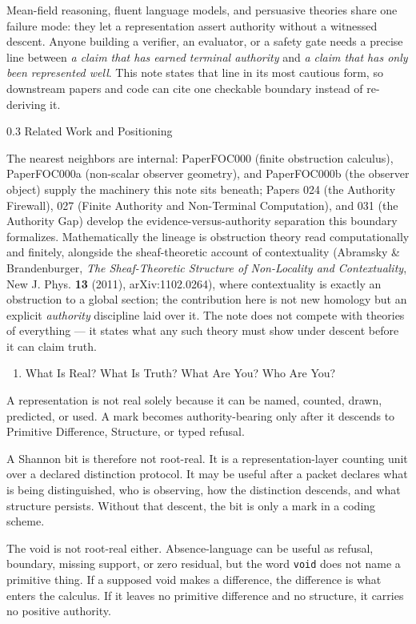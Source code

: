 \documentclass[
  10pt,
]{article}
\providecommand{\tightlist}{%
  \setlength{\itemsep}{0pt}\setlength{\parskip}{0pt}}
\providecommand{\tightlist}{%
  \setlength{\itemsep}{0pt}\setlength{\parskip}{0pt}}
\DeclareRobustCommand{\texttt}[1]{{\paperSymbolFont\nolinkurl{#1}}}
\begin{document}
Mean-field reasoning, fluent language models, and persuasive theories share one failure mode: they let a representation assert authority without a witnessed descent. Anyone building a verifier, an evaluator, or a safety gate needs a precise line between \emph{a claim that has earned terminal authority} and \emph{a claim that has only been represented well}. This note states that line in its most cautious form, so downstream papers and code can cite one checkable boundary instead of re-deriving it.

0.3 Related Work and Positioning

The nearest neighbors are internal: PaperFOC000 (finite obstruction calculus), PaperFOC000a (non-scalar observer geometry), and PaperFOC000b (the observer object) supply the machinery this note sits beneath; Papers 024 (the Authority Firewall), 027 (Finite Authority and Non-Terminal Computation), and 031 (the Authority Gap) develop the evidence-versus-authority separation this boundary formalizes. Mathematically the lineage is obstruction theory read computationally and finitely, alongside the sheaf-theoretic account of contextuality (Abramsky \& Brandenburger, \emph{The Sheaf-Theoretic Structure of Non-Locality and Contextuality}, New J. Phys. \textbf{13} (2011), arXiv:1102.0264), where contextuality is exactly an obstruction to a global section; the contribution here is not new homology but an explicit \emph{authority} discipline laid over it. The note does not compete with theories of everything --- it states what any such theory must show under descent before it can claim truth.

\begin{enumerate}
\def\labelenumi{\arabic{enumi}.}
\tightlist
\item
  What Is Real? What Is Truth? What Are You? Who Are You?
\end{enumerate}

A representation is not real solely because it can be named, counted, drawn, predicted, or used. A mark becomes authority-bearing only after it descends to Primitive Difference, Structure, or typed refusal.

A Shannon bit is therefore not root-real. It is a representation-layer counting unit over a declared distinction protocol. It may be useful after a packet declares what is being distinguished, who is observing, how the distinction descends, and what structure persists. Without that descent, the bit is only a mark in a coding scheme.

The void is not root-real either. Absence-language can be useful as refusal, boundary, missing support, or zero residual, but the word \texttt{void} does not name a primitive thing. If a supposed void makes a difference, the difference is what enters the calculus. If it leaves no primitive difference and no structure, it carries no positive authority.
\end{document}
